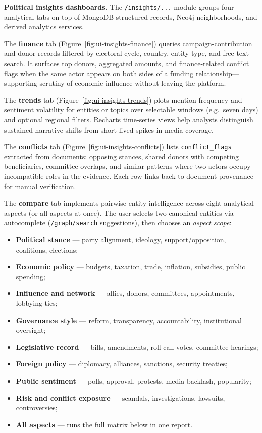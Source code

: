 \textbf{Political insights dashboards.} The \texttt{/insights/...} module groups four analytical tabs on top of MongoDB structured records, Neo4j neighborhoods, and derived analytics services.

The \textbf{finance} tab (Figure~\ref{fig:ui-insights-finance}) queries campaign-contribution and donor records filtered by electoral cycle, country, entity type, and free-text search. It surfaces top donors, aggregated amounts, and finance-related conflict flags when the same actor appears on both sides of a funding relationship---supporting scrutiny of economic influence without leaving the platform.

The \textbf{trends} tab (Figure~\ref{fig:ui-insights-trends}) plots mention frequency and sentiment volatility for entities or topics over selectable windows (e.g.\ seven days) and optional regional filters. Recharts time-series views help analysts distinguish sustained narrative shifts from short-lived spikes in media coverage.

The \textbf{conflicts} tab (Figure~\ref{fig:ui-insights-conflicts}) lists \texttt{conflict\_flags} extracted from documents: opposing stances, shared donors with competing beneficiaries, committee overlaps, and similar patterns where two actors occupy incompatible roles in the evidence. Each row links back to document provenance for manual verification.

The \textbf{compare} tab implements pairwise entity intelligence across eight analytical aspects (or all aspects at once). The user selects two canonical entities via autocomplete (\texttt{/graph/search} suggestions), then chooses an \emph{aspect scope}:
\begin{itemize}[leftmargin=*, itemsep=2pt]
\item \textbf{Political stance} --- party alignment, ideology, support/opposition, coalitions, elections;
\item \textbf{Economic policy} --- budgets, taxation, trade, inflation, subsidies, public spending;
\item \textbf{Influence and network} --- allies, donors, committees, appointments, lobbying ties;
\item \textbf{Governance style} --- reform, transparency, accountability, institutional oversight;
\item \textbf{Legislative record} --- bills, amendments, roll-call votes, committee hearings;
\item \textbf{Foreign policy} --- diplomacy, alliances, sanctions, security treaties;
\item \textbf{Public sentiment} --- polls, approval, protests, media backlash, popularity;
\item \textbf{Risk and conflict exposure} --- scandals, investigations, lawsuits, controversies;
\item \textbf{All aspects} --- runs the full matrix below in one report.
\end{itemize}

